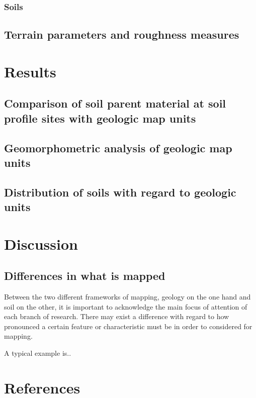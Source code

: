 \documentclass[final,1p,times,twocolumn,authoryear]{elsarticle}
\begin{document}
\subsubsection{Soils}
\subsection{Terrain parameters and roughness measures}
\citep{Riley1999}
\section{Results}
\subsection{Comparison of soil parent material at soil profile sites with geologic map units}
\subsection{Geomorphometric analysis of geologic map units}
\subsection{Distribution of soils with regard to geologic units}
\section{Discussion}
\subsection{Differences in what is mapped}
Between the two different frameworks of mapping, geology on the one hand and soil on the other, it is important to acknowledge the main focus of attention of each branch of research. There may exist a difference with regard to how pronounced a certain feature or characteristic must be in order to considered for mapping. 

A typical example is..

\section*{References}

\end{document}

